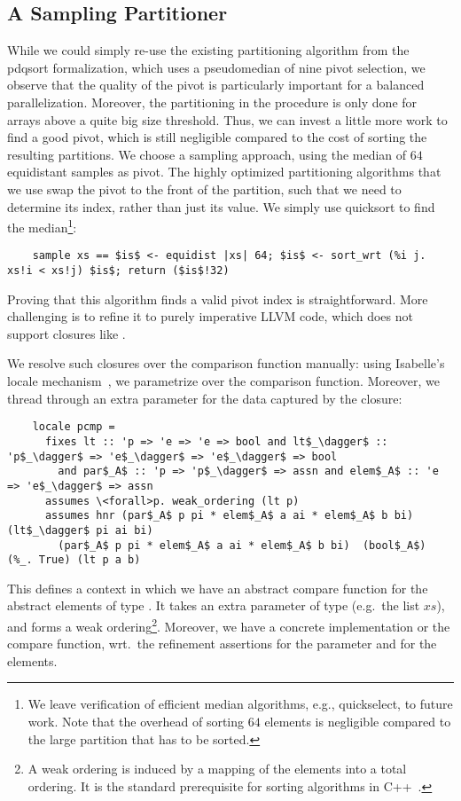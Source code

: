 \documentclass[a4paper,UKenglish,cleveref, autoref, thm-restate]{lipics-v2021}
\begin{document}
  \subsection{A Sampling Partitioner}
  While we could simply re-use the existing partitioning algorithm from the pdqsort formalization,
  which uses a pseudomedian of nine pivot selection, we observe that the quality of the pivot is
  particularly important for a balanced parallelization. Moreover, the partitioning in the  procedure
  is only done for arrays above a quite big size threshold. Thus, we can invest a little more work to find
  a good pivot, which is still negligible compared to the cost of sorting the resulting partitions.
  We choose a sampling approach, using the median of $64$ equidistant samples as pivot.
  The highly optimized partitioning algorithms that we use swap the pivot to the front of the partition,
  such that we need to determine its index, rather than just its value. We simply use quicksort to find the median\footnote{
  We leave verification of efficient median algorithms, e.g., quickselect, to future work. Note that the overhead of sorting $64$ elements is negligible compared to the large partition that has to be sorted.}:
  \begin{lstlisting}
    sample xs == $is$ <- equidist |xs| 64; $is$ <- sort_wrt (%i j. xs!i < xs!j) $is$; return ($is$!32)
  \end{lstlisting}
  Proving that this algorithm finds a valid pivot index is straightforward. More challenging is to refine it to
  purely imperative LLVM code, which does not support closures like .

  We resolve such closures over the comparison function manually: using Isabelle's locale mechanism~\cite{KWP99},
  we parametrize over the comparison function. Moreover, we thread through an extra parameter for the data
  captured by the closure:
  \begin{lstlisting}
    locale pcmp =
      fixes lt :: 'p => 'e => 'e => bool and lt$_\dagger$ :: 'p$_\dagger$ => 'e$_\dagger$ => 'e$_\dagger$ => bool
        and par$_A$ :: 'p => 'p$_\dagger$ => assn and elem$_A$ :: 'e => 'e$_\dagger$ => assn
      assumes \<forall>p. weak_ordering (lt p)
      assumes hnr (par$_A$ p pi * elem$_A$ a ai * elem$_A$ b bi) (lt$_\dagger$ pi ai bi)
        (par$_A$ p pi * elem$_A$ a ai * elem$_A$ b bi)  (bool$_A$)  (%_. True) (lt p a b)
  \end{lstlisting}
  This defines a context in which we have an abstract compare function  for the abstract elements of type .
  It takes an extra parameter of type  (e.g.\ the list $xs$), and forms a weak ordering\footnote{
    A weak ordering is induced by a mapping of the elements into a total ordering. It is the standard prerequisite for sorting algorithms in C++~\cite{Josu12}.
  }. Moreover, we have a concrete implementation  or the compare function, wrt.\ the refinement assertions
   for the parameter and  for the elements.
\end{document}

